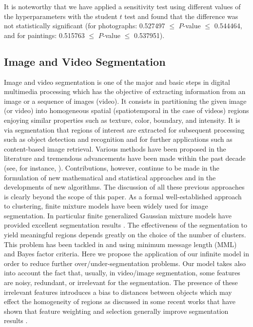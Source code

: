 \documentclass[journal,10pt]{elsart}
\begin{document}
 It is noteworthy that we have applied a sensitivity test using different values of the hyperparameters with the student $t$ test and found that the difference was not statistically significant (for photographs: 0.527497 $\leq$ $P$-value $\leq$ 0.544464, and for paintings: 0.515763 $\leq$ $P$-value $\leq$ 0.537951).
\subsection{Image and Video Segmentation}
Image and video segmentation is one of the major and basic steps in digital multimedia processing which has the objective of extracting information from an image or a sequence of images (video). It consists in partitioning the given image (or video) into homogeneous spatial (spatiotemporal in the case of videos) regions enjoying similar properties such as texture, color, boundary, and intensity. It is via segmentation that regions of interest are extracted for subsequent processing such as object detection and recognition and for further applications such as content-based image retrieval. Various methods have been proposed in the literature and tremendous advancements have been made within the past decade (see, for instance, \cite{Wang1998,Moscheni1998}). Contributions, however, continue to be made in the formulation of new mathematical and statistical approaches and in the developments of new algorithms. The discussion of all these previous approaches is clearly beyond the scope of this paper. As a formal well-established approach to clustering, finite mixture models have been widely used for image segmentation. In particular finite generalized Gaussian mixture models have provided excellent segmentation results  \cite{Allili2008,Guebaly2011}. The effectiveness of the segmentation to yield meaningful regions depends greatly on the choice of the number of clusters. This problem has been tackled in \cite{Allili2008} and \cite{Guebaly2011} using minimum message length (MML) and Bayes factor criteria. Here we propose the application of our infinite model in order to reduce further over/under-segmentation problems. Our model takes also into account the fact that, usually, in video/image segmentation, some features are noisy, redundant, or irrelevant for the segmentation. The presence of these irrelevant features introduces a bias to distances between objects which may effect the homogeneity of regions as discussed in some recent works that have shown that feature weighting and selection generally improve segmentation results \cite{Hung2008,Allili2010}.
\end{document}
